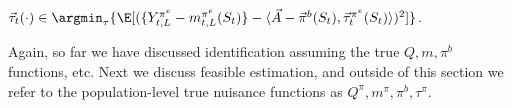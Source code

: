 \documentclass[opre,nonblindrev]{informs4}
\let\arxivSavedArgmin\argmin
\let\argmin\undefined
\let\argmin\arxivSavedArgmin
\newcommand{\blipadv}{\tau}
\begin{document}
 $\Vec{\blipadv}_t (\cdot) \in\argmin_\blipadv \{ 
    \E[ 
    ( \{     Y_{t,L}^{\pi^e}
    - m_{t,L}^{\pi^e}(S_t)\}
   - \langle \Vec{A} - \Vec{\pi}^b(S_t), \Vec{\blipadv}_{t}^{\pi^e}(S_t)
    \rangle
    )^2 
    ]
    \}$.

Again, so far we have discussed identification assuming the true $Q,m, \pi^b$ functions, etc. Next we discuss feasible estimation, and outside of this section we refer to the population-level true nuisance functions as $Q^{\pi},m^{\pi}, \pi^b, \blipadv^{\pi}$.


\end{document}
